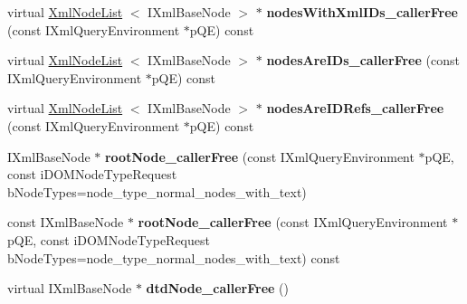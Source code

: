 \begin{DoxyCompactItemize}
\item 
\hypertarget{classgeneral__server_1_1XmlBaseDoc_a68172b04a967af3dabad137c159b98f5}{virtual \hyperlink{classgeneral__server_1_1XmlNodeList}{\-Xml\-Node\-List}\*
$<$ \-I\-Xml\-Base\-Node $>$ $\ast$ {\bfseries nodes\-With\-Xml\-I\-Ds\-\_\-caller\-Free} (const \-I\-Xml\-Query\-Environment $\ast$p\-Q\-E) const }\label{classgeneral__server_1_1XmlBaseDoc_a68172b04a967af3dabad137c159b98f5}

\item 
\hypertarget{classgeneral__server_1_1XmlBaseDoc_a5877b86751c112f550a548b8f6362e80}{virtual \hyperlink{classgeneral__server_1_1XmlNodeList}{\-Xml\-Node\-List}\*
$<$ \-I\-Xml\-Base\-Node $>$ $\ast$ {\bfseries nodes\-Are\-I\-Ds\-\_\-caller\-Free} (const \-I\-Xml\-Query\-Environment $\ast$p\-Q\-E) const }\label{classgeneral__server_1_1XmlBaseDoc_a5877b86751c112f550a548b8f6362e80}

\item 
\hypertarget{classgeneral__server_1_1XmlBaseDoc_a9e7fdb32952dc7b3245d23147d23236c}{virtual \hyperlink{classgeneral__server_1_1XmlNodeList}{\-Xml\-Node\-List}\*
$<$ \-I\-Xml\-Base\-Node $>$ $\ast$ {\bfseries nodes\-Are\-I\-D\-Refs\-\_\-caller\-Free} (const \-I\-Xml\-Query\-Environment $\ast$p\-Q\-E) const }\label{classgeneral__server_1_1XmlBaseDoc_a9e7fdb32952dc7b3245d23147d23236c}

\item 
\hypertarget{classgeneral__server_1_1XmlBaseDoc_acfe25358d523f24b895e2929dfa07ad6}{\-I\-Xml\-Base\-Node $\ast$ {\bfseries root\-Node\-\_\-caller\-Free} (const \-I\-Xml\-Query\-Environment $\ast$p\-Q\-E, const i\-D\-O\-M\-Node\-Type\-Request b\-Node\-Types=node\-\_\-type\-\_\-normal\-\_\-nodes\-\_\-with\-\_\-text)}\label{classgeneral__server_1_1XmlBaseDoc_acfe25358d523f24b895e2929dfa07ad6}

\item 
\hypertarget{classgeneral__server_1_1XmlBaseDoc_ad12afb58c736134aa68b519862143ee9}{const \-I\-Xml\-Base\-Node $\ast$ {\bfseries root\-Node\-\_\-caller\-Free} (const \-I\-Xml\-Query\-Environment $\ast$p\-Q\-E, const i\-D\-O\-M\-Node\-Type\-Request b\-Node\-Types=node\-\_\-type\-\_\-normal\-\_\-nodes\-\_\-with\-\_\-text) const }\label{classgeneral__server_1_1XmlBaseDoc_ad12afb58c736134aa68b519862143ee9}

\item 
\hypertarget{classgeneral__server_1_1XmlBaseDoc_a02f7ed9f7f07cab2a6638a572ffd6b4c}{virtual \-I\-Xml\-Base\-Node $\ast$ {\bfseries dtd\-Node\-\_\-caller\-Free} ()}\label{classgeneral__server_1_1XmlBaseDoc_a02f7ed9f7f07cab2a6638a572ffd6b4c}


\end{DoxyCompactItemize}
